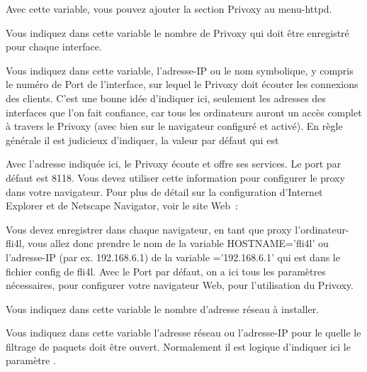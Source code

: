 \begin{description}

        Avec cette variable, vous pouvez ajouter la section Privoxy au menu-httpd.


        Vous indiquez dans cette variable le nombre de Privoxy qui doit être
        enregistré pour chaque interface.


        {Vous indiquez dans cette variable, l'adresse-IP ou le nom symbolique,
        y compris le numéro de Port de l'interface, sur lequel le Privoxy doit
        écouter les connexions des clients. C'est une bonne idée d'indiquer
        ici, seulement les adresses des interfaces que l'on fait confiance, car
        tous les ordinateurs auront un accès complet à travers le Privoxy (avec
        bien sur le navigateur configuré et activé). En règle générale il est
        judicieux d'indiquer, la valeur par défaut qui est 

        Avec l'adresse indiquée ici, le Privoxy écoute et offre ses services.
        Le port par défaut est 8118. Vous devez utiliser cette information pour
        configurer le proxy dans votre navigateur. Pour plus de détail sur
        la configuration d'Internet Explorer et de Netscape Navigator, voir le
        site Web~:

         

        Vous devez enregistrer dans chaque navigateur, en tant que proxy
        l'ordinateur-fli4l, vous allez donc prendre le nom de la variable
        HOSTNAME='fli4l' ou l'adresse-IP (par ex. 192.168.6.1) de la variable
        ='192.168.6.1' qui est dans le fichier config de
        fli4l. Avec le Port par défaut, on a ici tous les paramètres nécessaires,
        pour configurer votre navigateur Web, pour l'utilisation du Privoxy.}


        {Vous indiquez dans cette variable le nombre d'adresse réseau à installer.}


        Vous indiquez dans cette variable l'adresse réseau ou l'adresse-IP pour
        le quelle le filtrage de paquets doit être ouvert. Normalement il est
        logique d'indiquer ici le paramètre .


\end{description}
